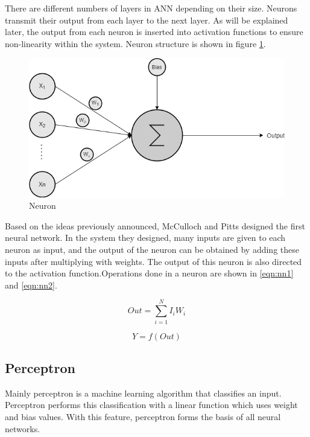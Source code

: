 There are different numbers of layers in ANN depending on their size. Neurons transmit their output from each layer to the next layer. As will be explained later, the output from each neuron is inserted into activation functions to ensure non-linearity within the system. Neuron structure is shown in figure \ref{fig:neuron_drawl}.

\begin{figure}[h]
    \centering
    \includegraphics[scale=0.5]{figures/chapter3/neuron.png}
    \caption{Neuron}
    \label{fig:neuron_drawl}
\end{figure}

Based on the ideas previously announced, McCulloch and Pitts designed the first neural network. In the system they designed, many inputs are given to each neuron as input, and the output of the neuron can be obtained by adding these inputs after multiplying with weights. The output of this neuron is also directed to the activation function.Operations done in a neuron are shown in \ref{eqn:nn1} and \ref{eqn:nn2}.

\begin{equation}
\label{eqn:nn1}
    Out = \sum\limits_{i=1}^{N}{I_i W_i}
\end{equation}

\begin{equation}
\label{eqn:nn2}
    Y = f(Out)
\end{equation}

\subsection{Perceptron}

Mainly perceptron is a machine learning algorithm that classifies an input. Perceptron performs this classification with a linear function which uses weight and bias values. With this feature, perceptron forms the basis of all neural networks.

